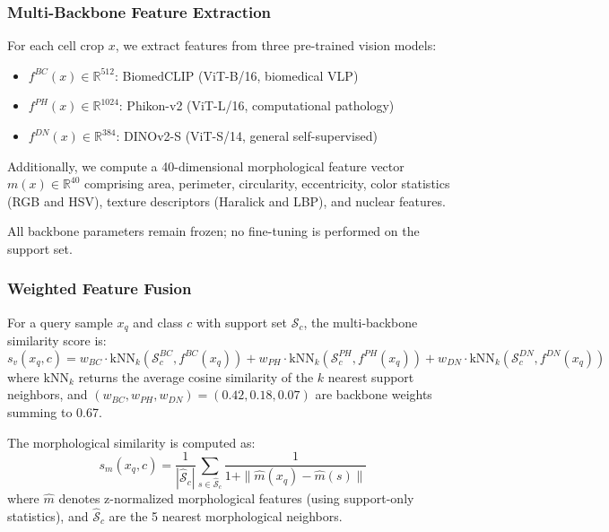\documentclass[preprint,review,12pt]{elsarticle}
\begin{document}
\subsubsection{Multi-Backbone Feature Extraction}

For each cell crop $x$, we extract features from three pre-trained vision models:
\begin{itemize}
    \item $f^{BC}(x) \in \mathbb{R}^{512}$: BiomedCLIP (ViT-B/16, biomedical VLP)
    \item $f^{PH}(x) \in \mathbb{R}^{1024}$: Phikon-v2 (ViT-L/16, computational pathology)
    \item $f^{DN}(x) \in \mathbb{R}^{384}$: DINOv2-S (ViT-S/14, general self-supervised)
\end{itemize}
Additionally, we compute a 40-dimensional morphological feature vector $m(x) \in \mathbb{R}^{40}$ comprising area, perimeter, circularity, eccentricity, color statistics (RGB and HSV), texture descriptors (Haralick and LBP), and nuclear features.

All backbone parameters remain frozen; no fine-tuning is performed on the support set.

\subsubsection{Weighted Feature Fusion}

For a query sample $x_q$ and class $c$ with support set $\mathcal{S}_c$, the multi-backbone similarity score is:
\begin{equation}
    s_v(x_q, c) = w_{BC} \cdot \text{kNN}_k(\mathcal{S}_c^{BC}, f^{BC}(x_q)) + w_{PH} \cdot \text{kNN}_k(\mathcal{S}_c^{PH}, f^{PH}(x_q)) + w_{DN} \cdot \text{kNN}_k(\mathcal{S}_c^{DN}, f^{DN}(x_q))
\end{equation}
where $\text{kNN}_k$ returns the average cosine similarity of the $k$ nearest support neighbors, and $(w_{BC}, w_{PH}, w_{DN}) = (0.42, 0.18, 0.07)$ are backbone weights summing to 0.67.

The morphological similarity is computed as:
\begin{equation}
    s_m(x_q, c) = \frac{1}{|\hat{\mathcal{S}}_c|} \sum_{s \in \hat{\mathcal{S}}_c} \frac{1}{1 + \|\hat{m}(x_q) - \hat{m}(s)\|}
\end{equation}
where $\hat{m}$ denotes z-normalized morphological features (using support-only statistics), and $\hat{\mathcal{S}}_c$ are the 5 nearest morphological neighbors.
\end{document}
